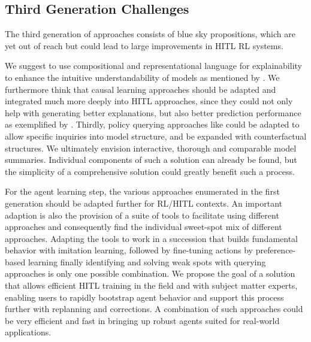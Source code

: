 \documentclass[twoside,11pt]{article}
\begin{document}
\subsection{Third Generation Challenges}
\label{sec:ThirdGeneration}

The third generation of approaches consists of blue sky propositions, which are yet out of reach but could lead to large improvements in HITL RL systems.


We suggest to use compositional and representational language for explainability to enhance the intuitive understandability of models as mentioned by \citet{RoyEtAl:2021:RLRoboticsChallenges}. We furthermore think that causal learning approaches should be adapted and integrated much more deeply into HITL approaches, since they could not only help with generating better explanations, but also better prediction performance as exemplified by \citet{MadumalEtAl:2020:CausalRLCFs}. Thirdly, policy querying approaches like \citet{HayesShah:2017:AutonomousPolicyExplanation} could be adapted to allow specific inquiries into model structure, and be expanded with counterfactual structures.
We ultimately envision interactive, thorough and comparable model summaries. Individual components of such a solution can already be found, but the simplicity of a comprehensive solution could greatly benefit such a process.



For the agent learning step, the various approaches enumerated in the first generation should be adapted further for RL/HITL contexts. An important adaption is also the provision of a suite of tools to facilitate using different approaches and consequently find the individual sweet-spot mix of different approaches. Adapting the tools to work in a succession that builds fundamental behavior with imitation learning, followed by fine-tuning actions by preference-based learning finally identifying and solving weak spots with querying approaches is only one possible combination.
We propose the goal of a solution that allows efficient HITL training in the field and with subject matter experts, enabling users to rapidly bootstrap agent behavior and support this process further with replanning and corrections. A combination of such approaches could be very efficient and fast in bringing up robust agents suited for real-world applications.
\end{document}
